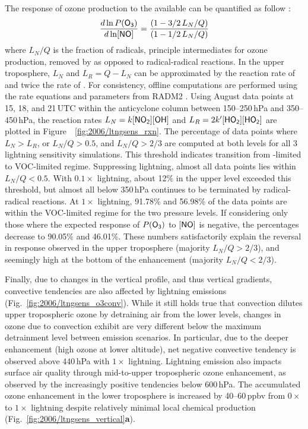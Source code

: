 The response of ozone production to the available  can be quantified as follow \citep{Kleinman:2001fk}:
\begin{equation}\label{eqn:k01NO}
	\frac{d\ln P(\chem{O_3})}{d\ln[\chem{NO}]} = \frac{(1-3/2\,L_N/Q)}{(1-1/2\,L_N/Q)}
\end{equation}
where $L_N/Q$ is the fraction of  radicals, principle intermediates for ozone production, removed by
 as opposed to radical-radical reactions. In the upper troposphere, $L_N$ and $L_R=Q-L_N$ can be
approximated by the reaction rate of  and twice the rate of . For consistency,
offline computations are performed using the rate equations and parameters from RADM2
\citep[][and references therein]{Stockwell:1990ez}. Using August data points at 15, 18, and 21\,\unit{UTC} within
the anticyclone column between 150--250\,\unit{hPa} and 350--450\,\unit{hPa}, the reaction rates
$L_N=k\chem{[NO_2][OH]}$ and $L_R=2k'\chem{[HO_2][HO_2]}$ are plotted in Figure~~\ref{fig:2006/ltngsens_rxn}.
The percentage of data points where $L_N>L_R$, or $L_N/Q > 0.5$, and $L_N/Q>2/3$ are computed at both
levels for all 3 lightning sensitivity simulations. This threshold indicates transition from -limited to
VOC-limited regime. Suppressing lightning, almost all data points lies within $L_N/Q<0.5$. With $0.1\times$
lightning, about 12\% in the upper level exceeded this threshold, but almost all  below 350\,\unit{hPa}
continues to be terminated by radical-radical reactions. At $1\times$ lightning, 91.78\% and 56.98\% of the data
points are within the VOC-limited regime for the two pressure levels. If considering only those where the expected response of $P(\chem{O_3})$
to $[\chem{NO}]$ is negative, the percentages decrease to 90.05\% and 46.01\%. These numbers satisfactorily
explain the reversal in response observed in the upper troposphere (majority $L_N/Q>2/3$), and seemingly high
at the bottom of the enhancement (majority $L_N/Q<2/3$).

Finally, due to changes in the vertical profile, and thus vertical gradients, convective tendencies are also affected by
lightning emissions (Fig.~\ref{fig:2006/ltngsens_o3conv}). While it still holds true that convection dilutes upper
tropospheric ozone by detraining air from the lower levels, changes in ozone due to convection exhibit are very different
below the maximum detrainment level between emission scenarios. In particular, due to the deeper enhancement (high
ozone at lower altitude), net negative convective tendency is observed above 440\,\unit{hPa} with $1\times$ lightning.
Lightning emission also impacts surface air quality through mid-to-upper tropospheric ozone enhancement, as observed
by the increasingly positive tendencies below 600\,\unit{hPa}. The accumulated ozone enhancement in the lower
troposphere is increased by 40--60\,\unit{ppbv} from $0\times$ to $1\times$ lightning despite relatively minimal local
chemical production (Fig.~\ref{fig:2006/ltngsens_vertical}{\bf a}).

